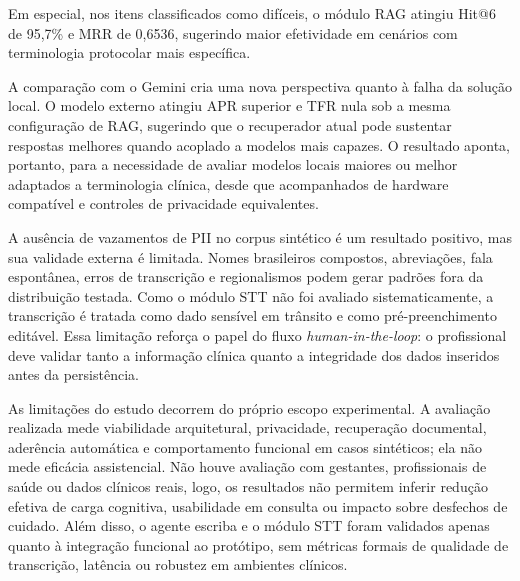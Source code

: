 \documentclass[12pt]{article}
\begin{document}
Em especial, nos itens classificados como difíceis, o módulo RAG atingiu Hit@6 de 95,7\% e MRR de 0,6536, sugerindo maior efetividade em cenários com terminologia protocolar mais específica.

A comparação com o Gemini cria uma nova perspectiva quanto à falha da solução local.
O modelo externo atingiu APR superior e TFR nula sob a mesma configuração de RAG, sugerindo que o recuperador atual pode sustentar respostas melhores quando acoplado a modelos mais capazes.
O resultado aponta, portanto, para a necessidade de avaliar modelos locais maiores ou melhor adaptados a terminologia clínica, desde que acompanhados de hardware compatível e controles de privacidade equivalentes.

A ausência de vazamentos de PII no corpus sintético é um resultado positivo, mas sua validade externa é limitada. Nomes brasileiros compostos, abreviações, fala espontânea, erros de transcrição e regionalismos podem gerar padrões fora da distribuição testada.
Como o módulo STT não foi avaliado sistematicamente, a transcrição é tratada como dado sensível em trânsito e como pré-preenchimento editável.
Essa limitação reforça o papel do fluxo \textit{human-in-the-loop}: o profissional deve validar tanto a informação clínica quanto a integridade dos dados inseridos antes da persistência.

As limitações do estudo decorrem do próprio escopo experimental.
A avaliação realizada mede viabilidade arquitetural, privacidade, recuperação documental, aderência automática e comportamento funcional em casos sintéticos; ela não mede eficácia assistencial. Não houve avaliação com gestantes, profissionais de saúde ou dados clínicos reais, logo, os resultados não permitem inferir redução efetiva de carga cognitiva, usabilidade em consulta ou impacto sobre desfechos de cuidado.
Além disso, o agente escriba e o módulo STT foram validados apenas quanto à integração funcional ao protótipo, sem métricas formais de qualidade de transcrição, latência ou robustez em ambientes clínicos.
\end{document}
